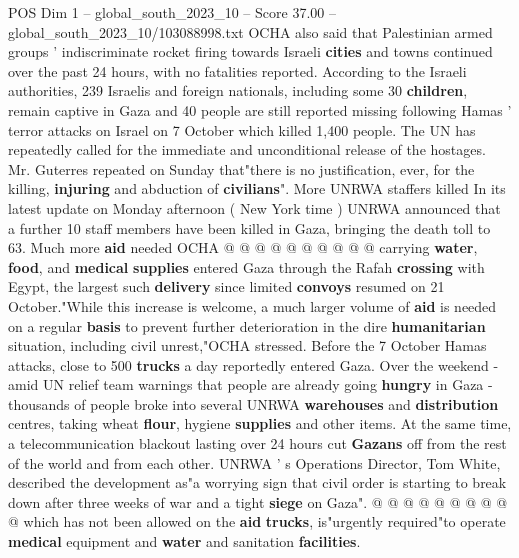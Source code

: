 \begin{textsample}{POS Dim 1 – global\_south\_2023\_10 – Score 37.00 – global\_south\_2023\_10/103088998.txt}
OCHA also said that Palestinian armed groups ' indiscriminate rocket firing towards Israeli \textbf{cities} and towns continued over the past 24 hours, with no fatalities reported.
According to the Israeli authorities, 239 Israelis and foreign nationals, including some 30 \textbf{children}, remain captive in Gaza and 40 people are still reported missing following Hamas ' terror attacks on Israel on 7 October which killed 1,400 people.
The UN has repeatedly called for the immediate and unconditional release of the hostages.
Mr.
Guterres repeated on Sunday that"there is no justification, ever, for the killing, \textbf{injuring} and abduction of \textbf{civilians}".
More UNRWA staffers killed In its latest update on Monday afternoon ( New York time ) UNRWA announced that a further 10 staff members have been killed in Gaza, bringing the death toll to 63.
Much more \textbf{aid} needed OCHA @ @ @ @ @ @ @ @ @ @ carrying \textbf{water}, \textbf{food}, and \textbf{medical} \textbf{supplies} entered Gaza through the Rafah \textbf{crossing} with Egypt, the largest such \textbf{delivery} since limited \textbf{convoys} resumed on 21 October."While this increase is welcome, a much larger volume of \textbf{aid} is needed on a regular \textbf{basis} to prevent further deterioration in the dire \textbf{humanitarian} situation, including civil unrest,"OCHA stressed.
Before the 7 October Hamas attacks, close to 500 \textbf{trucks} a day reportedly entered Gaza.
Over the weekend - amid UN relief team warnings that people are already going \textbf{hungry} in Gaza - thousands of people broke into several UNRWA \textbf{warehouses} and \textbf{distribution} centres, taking wheat \textbf{flour}, hygiene \textbf{supplies} and other items.
At the same time, a telecommunication blackout lasting over 24 hours cut \textbf{Gazans} off from the rest of the world and from each other.
UNRWA ' s Operations Director, Tom White, described the development as"a worrying sign that civil order is starting to break down after three weeks of war and a tight \textbf{siege} on Gaza". @ @ @ @ @ @ @ @ @ @ which has not been allowed on the \textbf{aid} \textbf{trucks}, is"urgently required"to operate \textbf{medical} equipment and \textbf{water} and sanitation \textbf{facilities}.

\end{textsample}
